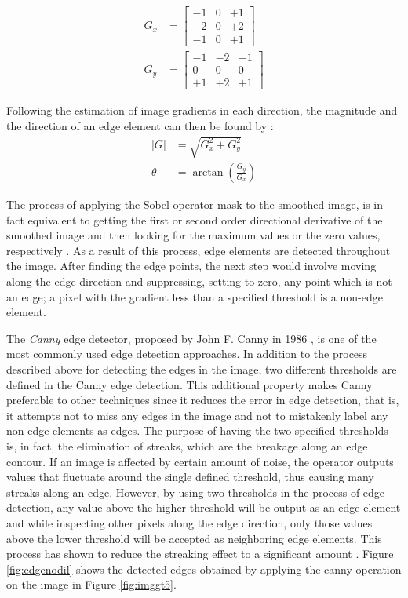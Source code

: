 \begin{align}
G_{x} &= \begin{bmatrix}
-1 & 0 & +1 \\ 
-2 & 0 & +2 \\ 
-1 & 0 & +1
\end{bmatrix} \\
G_{y} &= \begin{bmatrix}
-1 & -2 & -1 \\ 
0 & 0 & 0 \\ 
+1 & +2 & +1
\end{bmatrix}
\end{align}

Following the estimation of image gradients in each direction, the magnitude and the direction of an edge element can then be found by \cite{sze11}:
\begin{align}
\left | G \right | &= \sqrt{G_{x}^{2} + G_{y}^{2}} \\
\theta &= \arctan (\frac{G_{y}}{G_{x}})
\end{align}

The process of applying the Sobel operator mask to the smoothed image, is in fact equivalent to getting 
the first or second order directional derivative of the smoothed image and then looking for the maximum values or the zero values, 
respectively \cite{sze11}. 
As a result of this process, edge elements are detected throughout the image.
After finding the edge points, the next step would involve moving along the edge direction and suppressing, setting to zero, any point which is not an edge;
a pixel with the gradient less than a specified threshold is a non-edge element.

The {\it Canny} edge detector, proposed by John F. Canny in 1986 \cite{canny86}, is one of the most commonly used edge detection approaches. In addition 
to the process described above for detecting the edges in the image, two different thresholds are defined in the Canny edge detection. This
additional property makes Canny preferable to other techniques since it reduces the error in edge detection, that is, it attempts
not to miss any edges in the image and not to mistakenly label any non-edge elements as edges.
The purpose of having the two specified thresholds is, in fact, the elimination of streaks, which are the breakage along an edge contour.
If an image is affected by certain amount of noise, the operator outputs values that fluctuate around the single defined threshold, thus
causing many streaks along an edge.
However, by using two thresholds in the process of edge detection, 
any value above the higher threshold will be output as an edge element and while inspecting other pixels along 
the edge direction, only those values above the lower threshold will be accepted as neighboring edge elements.
This process has shown to reduce the streaking effect to a significant amount \cite{canny86}. \newline
Figure \ref{fig:edgenodil} shows the detected edges obtained by applying the canny operation on the image in Figure \ref{fig:imggt5}.

